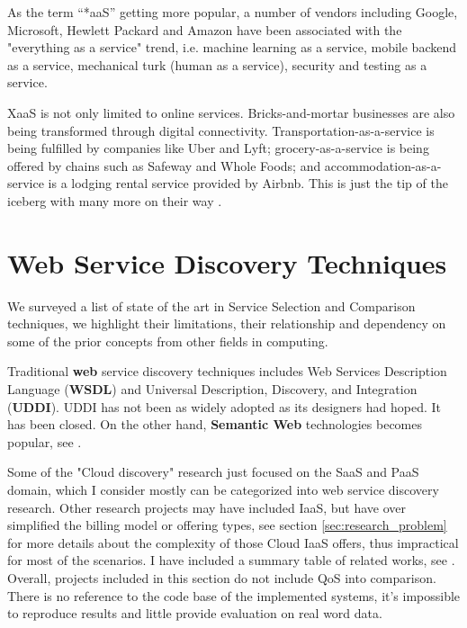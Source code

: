 As the term \enquote{*aaS} getting more popular, a number of vendors including Google, Microsoft, Hewlett Packard and Amazon have been associated with the "everything as a service" trend, i.e. machine learning as a service, mobile backend as a service, mechanical turk (human as a service), security and testing as a service.

XaaS is not only limited to online services. Bricks-and-mortar businesses are also being transformed through digital connectivity. Transportation-as-a-service is being fulfilled by companies like Uber and Lyft; grocery-as-a-service is being offered by chains such as Safeway and Whole Foods; and accommodation-as-a-service is a lodging rental service provided by Airbnb. This is just the tip of the iceberg with many more on their way \cite{XaaS_beyond}.

\section{Web Service Discovery Techniques}
\label{sec:WebServiceDiscoveryTechniques}
We surveyed a list of state of the art in Service Selection and Comparison techniques, we highlight their limitations, their relationship and dependency on some of the prior concepts from other fields in computing. 

Traditional \textbf{web} service discovery techniques includes Web Services Description Language (\textbf{WSDL}) and Universal Description, Discovery, and Integration (\textbf{UDDI}). UDDI has not been as widely adopted as its designers had hoped. It has been closed. On the other hand, \textbf{Semantic Web} technologies becomes popular, see .

Some of the "Cloud discovery" research just focused on the SaaS and PaaS domain, which I consider mostly can be categorized into web service discovery research. Other research projects may have included IaaS, but have over simplified the billing model or offering types, see section \ref{sec:research_problem} for more details about the complexity of those Cloud IaaS offers, thus impractical for most of the scenarios. I have included a summary table of related works, see . Overall, projects included in this section do not include QoS into comparison. There is no reference to the code base of the implemented systems, it's impossible to reproduce results and little provide evaluation on real word data.

